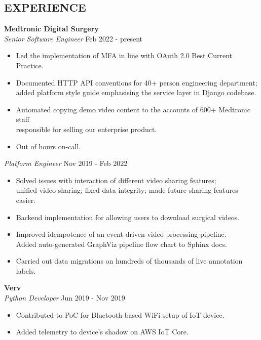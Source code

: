\documentclass[line,margin]{res}
\begin{document}
\begin{resume}
\section{EXPERIENCE} \textbf{Medtronic Digital Surgery} \\
                {\sl Senior Software Engineer} \hfill   Feb 2022 - present \\
                 \begin{itemize}  \itemsep  -0pt %
                   \item Led the implementation of MFA in line with OAuth 2.0 Best Current Practice.
                   \item Documented HTTP API conventions for 40+ person engineering department; \\
		         added platform style guide emphasising the service layer in Django codebase.
                   \item Automated copying demo video content to the accounts of 600+ Medtronic staff \\
                         responsible for selling our enterprise product.
                   \item Out of hours on-call.
                 \end{itemize}
                {\sl Platform Engineer} \hfill          Nov 2019 - Feb 2022 \\
                  \begin{itemize}  \itemsep -0pt %
                  \item Solved issues with interaction of different video sharing features; \\
                        unified video sharing; fixed data integrity; made future sharing features easier.
                  \item Backend implementation for allowing users to download surgical videos.
                  \item Improved idempotence of an event-driven video processing pipeline. \\
                        Added auto-generated GraphViz pipeline flow chart to Sphinx docs.
                  \item Carried out data migrations on hundreds of thousands of live annotation labels.
                  \end{itemize}

                \textbf{Verv} \\
                {\sl Python Developer} \hfill        Jun 2019 - Nov 2019 \\
                  \begin{itemize} \itemsep -0pt %
                  \item Contributed to PoC for Bluetooth-based WiFi setup of IoT device.\
                  \item Added telemetry to device's shadow on AWS IoT Core.
                  \end{itemize}


\end{resume}
\end{document}
